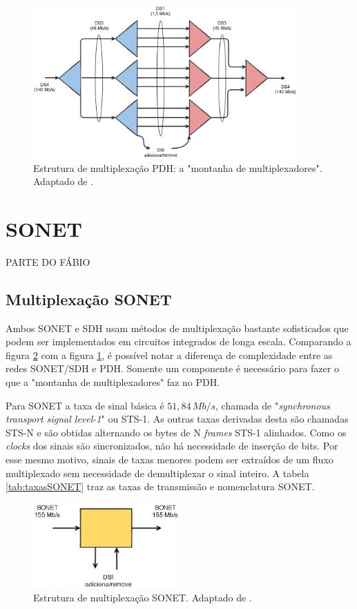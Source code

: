 \begin{figure}
\centering
\includegraphics[width=0.9\textwidth]{image/mux_pdh.eps}
\caption{\label{fig:muxPDH} Estrutura de multiplexação PDH: a "montanha de multiplexadores". Adaptado de \cite{Ramaswami2010}.}
\end{figure}

\section{SONET}

PARTE DO FÁBIO

\subsection{Multiplexação SONET}

Ambos SONET e SDH usam métodos de multiplexação bastante sofisticados que podem ser implementados em circuitos integrados de longa escala. Comparando a figura \ref{fig:muxSDH} com a figura \ref{fig:muxPDH}, é possível notar a diferença de complexidade entre as redes SONET/SDH e PDH. Somente um componente é necessário para fazer o que a "montanha de multiplexadores" faz no PDH.

Para SONET a taxa de sinal básica é $51,84 \, Mb/s$, chamada de "\textit{synchronous transport signal level-1}" ou STS-1. As outras taxas derivadas desta são chamadas STS-N e são obtidas alternando os bytes de N  \textit{frames} STS-1 alinhados. Como os \textit{clocks} dos sinais são sincronizados, não há necessidade de inserção de bits. Por esse mesmo motivo, sinais de taxas menores podem ser extraídos de um fluxo multiplexado sem necessidade de demultiplexar o sinal inteiro. A tabela \ref{tab:taxasSONET} traz as taxas de transmissão e nomenclatura SONET.

\begin{figure}
\centering
\includegraphics[width=0.5\textwidth]{image/mux_sonet.eps}
\caption{\label{fig:muxSDH} Estrutura de multiplexação SONET. Adaptado de \cite{Ramaswami2010}.}
\end{figure}

